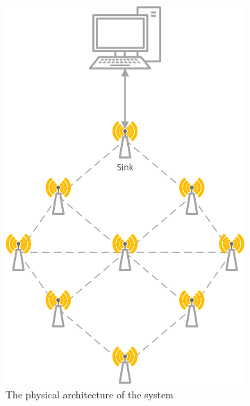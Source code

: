 \begin{figure}[]
	\centering
	\begin{subfigure}[t]{0.4\textwidth}
		\centering
    		\includegraphics[scale=0.6]{content/images/Architecture}
   	 	\caption{The physical architecture of the system}
    	\label{fig:architecture}
    \end{subfigure}
    \quad
    \quad
    \quad
    \begin{subfigure}[t]{0.4\textwidth}
		\centering         

\end{subfigure}
\end{figure}
